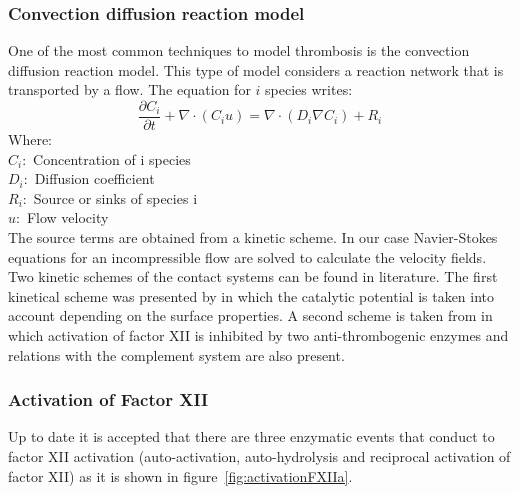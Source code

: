 \documentclass[%
 nofootinbib,
 amsmath,amssymb,
 aps,
 pra,
]{revtex4-1}
\begin{document}
\subsubsection{Convection diffusion reaction model}
One of the most common techniques to model thrombosis is the convection diffusion reaction model. This type of model considers a reaction network that is transported by a flow. The equation for $i$ species  writes:
\begin{equation}\label{eq:CDR}
\frac{\partial C_{i}}{\partial t} + \nabla \cdot (C_{i}u)  = \nabla \cdot (D_{i} \nabla C_{i}) + R_{i}
\end{equation}
Where: \\
$C_{i} : $ Concentration of i species \\
$D_{i} : $ Diffusion coefficient \\
$R_{i} : $ Source or sinks of species i \\
$u : $ Flow velocity \\

The source terms are obtained from a kinetic scheme. In our case Navier-Stokes equations for an incompressible flow are solved to calculate the velocity fields.\\
Two kinetic schemes of the contact systems can be found in literature. The first kinetical scheme was presented by \citet{Guo:2006} in which the catalytic potential is taken into account depending on the surface properties. A second scheme is taken from \citet{Chatterjee:2010} in which activation of factor XII is inhibited by two anti-thrombogenic enzymes and relations with the complement system are also present.
\subsubsection{Activation of Factor XII}
Up to date it is accepted that there are three enzymatic events that conduct to factor XII activation (auto-activation, auto-hydrolysis  and reciprocal activation of factor XII) as it is shown in figure~\ref{fig:activationFXIIa}.\\
\end{document}
